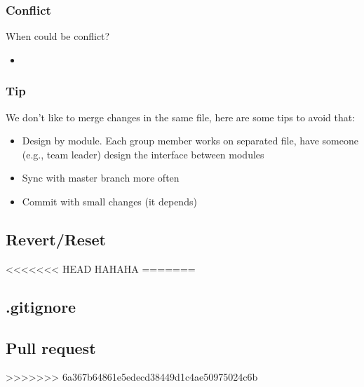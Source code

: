 \documentclass{beamer}
\begin{document}
			\begin{frame}
				\frametitle{Conflict}
				When could be conflict?
				\begin{itemize}
					\item 
				\end{itemize}
			\end{frame}

			\begin{frame}
				\frametitle{Tip}
				We don't like to merge changes in the same file, here are some tips to avoid that:
				\begin{itemize}
					\item Design by module. Each group member works on separated file, have someone (e.g., team leader) design the interface between modules
					\item Sync with master branch more often
					\item Commit with small changes (it depends)
				\end{itemize}
			\end{frame}

		\subsection{Revert/Reset}

<<<<<<< HEAD
	HAHAHA
=======
		\subsection{.gitignore}

		\subsection{Pull request}
>>>>>>> 6a367b64861e5edecd38449d1c4ae50975024c6b
\end{document}
